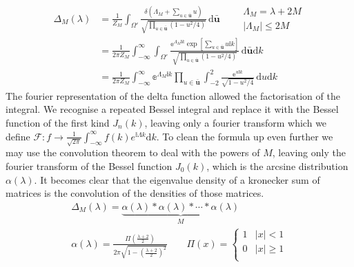 \documentclass{article}[12pt]
\numberwithin{equation}{section}
\begin{document}
\begin{align*}
  \Delta_M(\lambda)&=\frac{1}{Z_M}
  \int_{\Omega'}\!
  \frac{\delta(\Lambda_M+\sum_{u\in\bar{\mathbf{u}}}u)}
  {\sqrt{\prod_{u\in\bar{\mathbf{u}}}(1-u^2/4) }}
  \,\mathrm{d}\bar{\mathbf{u}}
  \qquad
  \begin{matrix}
    \Lambda_M=\lambda+2M \\
    |\Lambda_M|\leq2M
  \end{matrix}\\
  &=\frac{1}{2\pi Z_M}
  \int_{-\infty}^{\infty}\int_{\Omega'}\!
  \frac{\mathbb{e}^{\Lambda_M\mathbb{i}k}\exp[\sum_{u\in\bar{\mathbf{u}}}u\mathbb{i}k]}
  {\sqrt{\prod_{u\in\bar{\mathbf{u}}}(1-u^2/4) }}
  \,\mathrm{d}\bar{\mathbf{u}}\mathrm{d}k\\
  &=\frac{1}{2\pi Z_M}
  \int_{-\infty}^{\infty}\mathbb{e}^{\Lambda_M\mathbb{i}k}
  \prod_{u\in\bar{\mathbf{u}}}\int_{-2}^{2}\!
  \frac{\mathbb{e}^{u\mathbb{i}k}}
  {\sqrt{1-u^2/4}}
  \,\mathrm{d}u\mathrm{d}k
\end{align*}
The fourier representation of the delta function allowed the
factorisation of the integral. We recognise a repeated Bessel
integral and replace it with the Bessel function of the first kind
$J_n(k)$, leaving only a fourier transform which we define
$ \mathcal{F} :
f\rightarrow \frac{1}{\sqrt{2\pi}}
\int_{-\infty}^{\infty}f(k)e^{\mathbb{i}\Lambda k}\mathrm{d}k$. To clean
the formula up even further we may use the convolution
theorem to deal with the powers of $M$, leaving only the fourier
transform of the Bessel function $J_0(k)$, which is the arcsine
distribution $\alpha(\lambda)$. It becomes clear that the eigenvalue
density of a kronecker sum of matrices is the convolution of the densities
of those matrices.
\begin{align}
  \Delta_M(\lambda)=\underbrace{
  \alpha(\lambda)*\alpha(\lambda)*\cdots*\alpha(\lambda)}_{M}\qquad\qquad\label{eq:mlap}\\
    \alpha(\lambda)=
      \frac{\Pi\left(\frac{\lambda+2}{2}\right)}{2\pi\sqrt{1-\left(\frac{\lambda+2}{2}\right)^2}}
    \qquad
    \Pi(x)=
      \begin{cases}
        1 & |x|<1\\
        0 & |x|\geq1\\
      \end{cases}
\end{align}
\end{document}

